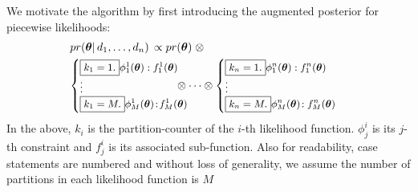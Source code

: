 We motivate the algorithm by first introducing the augmented posterior for piecewise likelihoods:
\begin{align}
\label{e:expanded}
&pr(\boldsymbol\theta | \, d_1, \ldots, d_n) \, 
\propto 
pr(\boldsymbol\theta) \; \otimes
\\
&{\footnotesize
\begin{cases}
\boxed{k_1 = 1.} {\phi^{1}_{1}(\boldsymbol\theta)  : f^{1}_{1}(\boldsymbol\theta)}\\
\vdots
\\
\boxed{k_1 = M.} \phi^{1}_{M}(\boldsymbol\theta)  \!:\! f^{1}_{M}(\boldsymbol\theta)
\end{cases}
}%
\!\!\!\!\!\!\!\!\!\!\!\!\!
\otimes
\cdots
\otimes
{\footnotesize
\begin{cases}
\boxed{k_n = 1.} \phi^{n}_{1}(\boldsymbol\theta)  : f^{n}_{1}(\boldsymbol\theta)\\
\vdots
\\
\boxed{k_n = M.} \phi^{n}_{M}(\boldsymbol\theta)  \!: f^{n}_{M}(\boldsymbol\theta)
\end{cases}
}%
\end{align} 
%
In the above, $k_i$ is the partition-counter of the $i$-th likelihood function. 
$\phi^i_{j}$ is its $j$-th constraint and
 $f^i_{j}$ is its associated sub-function. 
 Also for readability, case statements are numbered and without loss of
generality, we assume the number of partitions in each
likelihood function is $M$

